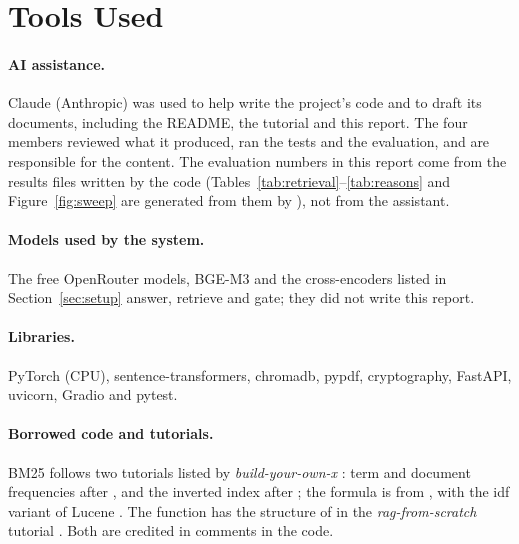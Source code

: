 \section*{Tools Used}
\label{sec:tools}

\paragraph{AI assistance.} Claude (Anthropic) was used to help write the project's code and to draft its documents, including the README, the tutorial and this report. The four members reviewed what it produced, ran the tests and the evaluation, and are responsible for the content. The evaluation numbers in this report come from the results files written by the code (Tables~\ref{tab:retrieval}--\ref{tab:reasons} and Figure~\ref{fig:sweep} are generated from them by ), not from the assistant. 

\paragraph{Models used by the system.} The free OpenRouter models, BGE-M3 and the cross-encoders listed in Section~\ref{sec:setup} answer, retrieve and gate; they did not write this report.

\paragraph{Libraries.} PyTorch (CPU), sentence-transformers, chromadb, pypdf, cryptography, FastAPI, uvicorn, Gradio and pytest.

\paragraph{Borrowed code and tutorials.} BM25 follows two tutorials listed by \emph{build-your-own-x} \citep{buildyourownx}: term and document frequencies after \citet{loria_tfidf}, and the inverted index after \citet{boyter_vsm}; the formula is from \citet{robertson2009bm25}, with the idf variant of Lucene \citep{lucenebm25}. The function  has the structure of  in the \emph{rag-from-scratch} tutorial \citep{ragfromscratch}. Both are credited in comments in the code.
